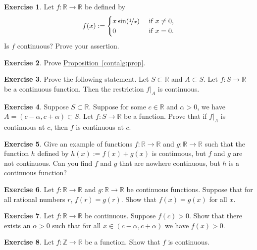 \documentclass[12pt]{book}
\newcommand{\R}{{\mathbb{R}}}
\newcommand{\Z}{{\mathbb{Z}}}
\theoremstyle{plain}
\theoremstyle{remark}
\theoremstyle{definition}
\theoremstyle{exercise}
\newtheorem{exercise}{Exercise}[section]
\theoremstyle{example}
\newcommand{\propref}[1]{\hyperref[#1]{Proposition~\ref*{#1}}}
\begin{document}
\begin{exercise}
Let $f \colon \R \to \R$ be
defined by
\begin{equation*}
f(x) :=
\begin{cases}
x \sin(\nicefrac{1}{x}) & \text{ if $x \not= 0$,} \\
0 & \text{ if $x=0$.}
\end{cases}
\end{equation*}
Is $f$ continuous?  Prove your assertion.
\end{exercise}

\begin{exercise}
Prove \propref{contalg:prop}.
\end{exercise}

\begin{exercise}
Prove the following statement.
Let $S \subset \R$ and $A \subset S$.  Let $f \colon S \to \R$
be a continuous function.
Then the restriction $f|_A$ is continuous.
\end{exercise}

\begin{exercise}
Suppose $S \subset \R$.  Suppose for some $c \in \R$
and $\alpha > 0$, we have $A=(c-\alpha,c+\alpha) \subset S$.
Let $f \colon S \to \R$ be a function.  Prove that
if $f|_A$ is continuous at $c$, then $f$ is continuous at $c$.
\end{exercise}

\begin{exercise}
Give an example of functions $f \colon \R \to \R$ and $g \colon \R \to \R$
such that the function $h$ defined by $h(x) := f(x) + g(x)$ is continuous,
but $f$ and $g$ are not continuous.  Can you find $f$ and $g$ that are nowhere
continuous, but $h$ is a continuous function?
\end{exercise}

\begin{exercise}
Let $f \colon \R \to \R$ and 
$g \colon \R \to \R$ be continuous functions.  Suppose that for
all rational numbers $r$, $f(r) = g(r)$.  Show that $f(x) = g(x)$ for all
$x$.
\end{exercise}

\begin{exercise}
Let $f \colon \R \to \R$ be continuous.  Suppose $f(c) > 0$.  Show that
there exists an $\alpha > 0$ such that for all $x \in (c-\alpha,c+\alpha)$
we have $f(x) > 0$.
\end{exercise}

\begin{exercise}
Let $f \colon \Z \to \R$ be a function.  Show that $f$ is continuous.
\end{exercise}
\end{document}
